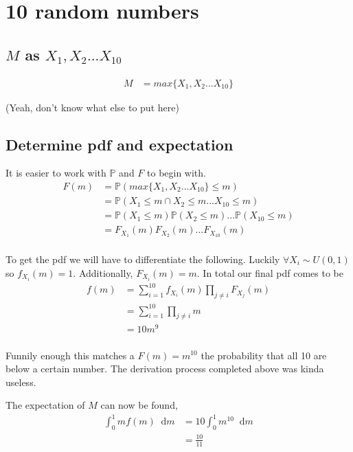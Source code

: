\documentclass{article}
\newcommand{\diff}{\mathop{}\!\mathrm{d}}
\newcommand{\prob}{\mathbb{P}}
\begin{document}
\section{10 random numbers}
\subsection{$M$ as $X_1, X_2 ... X_{10}$}
\begin{align*}
    M &= max\{X_1, X_2 ... X_{10}\}
\end{align*}

(Yeah, don't know what else to put here)

\subsection{Determine pdf and expectation}
It is easier to work with $\prob$ and $F$ to begin with.
\begin{align*}
    F(m) &= \prob(max\{X_1, X_2... X_{10}\} \leq m) \\
    &= \prob(X_1 \leq m \cap X_2 \leq m ... X_{10} \leq m) \\
    &= \prob(X_1 \leq m) \prob(X_2 \leq m) ... \prob(X_{10} \leq m) \\
    &= F_{X_1}(m) F_{X_2}(m) ... F_{X_{10}}(m) \\
\end{align*}

To get the pdf we will have to differentiate the following. Luckily
$\forall X_i \sim U(0,1)$ so $f_{X_i}(m) = 1$. Additionally, $F_{X_i}(m) = m$.
In total our final pdf comes
to be
\begin{align*}
    f(m) &= \sum_{i=1}^{10} f_{X_i}(m) \prod_{j \neq i} F_{X_j}(m) \\
    &= \sum_{i=1}^{10} \prod_{j \neq i} m \\
    &= 10m^9 \\
\end{align*}

Funnily enough this matches a $F(m) = m^{10}$ the probability that all 10
are below a certain number. The derivation process completed above was
kinda useless.

The expectation of $M$ can now be found,
\begin{align*}
    \int_0^1 m f(m) \diff m &= 10 \int_0^1 m^10 \diff m \\
    &= \frac{10}{11} \\
\end{align*}
\end{document}
